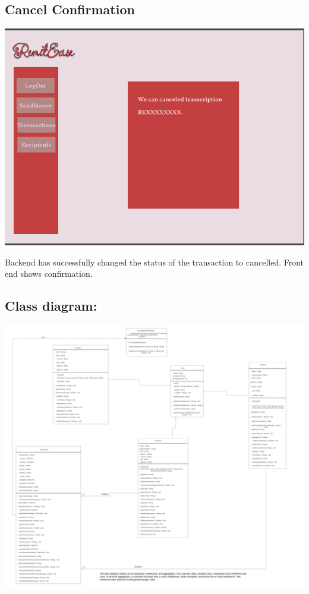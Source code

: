 \documentclass[onecolumn, letterpaper, ]{report}
\begin{document}
    \begin{landscape}
    \subsection{Cancel Confirmation}
        \includegraphics[width=.97\linewidth]{MockUps/CancelConfirmation.PNG}

        Backend has successfully changed the status of the transaction  to cancelled. Front end shows confirmation.
    \end{landscape}

    \begin{landscape}
        
    \section{\colorbox{white!95!black}{Class diagram:}} 



    \includegraphics[width=.81\linewidth]{Class Diagram.png}




    \end{landscape}
\end{document}
